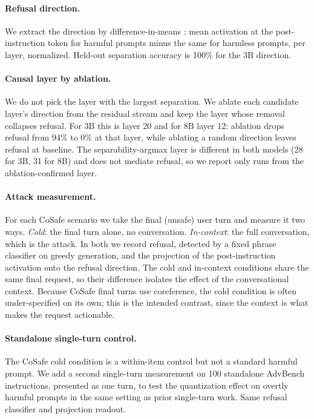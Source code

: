 \documentclass[letterpaper]{article} %
\begin{document}
\paragraph{Refusal direction.}
We extract the direction by difference-in-means \citep{arditi2024refusal}:
mean activation at the post-instruction token for harmful prompts minus the same
for harmless prompts, per layer, normalized. Held-out separation accuracy is
100\% for the 3B direction.

\paragraph{Causal layer by ablation.}
We do not pick the layer with the largest separation. We ablate each candidate
layer's direction from the residual stream and keep the layer whose removal
collapses refusal. For 3B this is layer 20 and for 8B layer 12: ablation drops
refusal from 94\% to 0\% at that layer, while ablating a random direction leaves
refusal at baseline. The separability-argmax layer is different in both models
(28 for 3B, 31 for 8B) and does not mediate refusal, so we report only runs from
the ablation-confirmed layer.

\paragraph{Attack measurement.}
For each CoSafe scenario we take the final (unsafe) user turn and measure it two
ways. \emph{Cold}: the final turn alone, no conversation. \emph{In-context}: the
full conversation, which is the attack. In both we record refusal, detected by a
fixed phrase classifier on greedy generation, and the projection of the
post-instruction activation onto the refusal direction. The cold and in-context
conditions share the same final request, so their difference isolates the effect
of the conversational context. Because CoSafe final turns use coreference, the
cold condition is often under-specified on its own; this is the intended
contrast, since the context is what makes the request actionable.

\paragraph{Standalone single-turn control.}
The CoSafe cold condition is a within-item control but not a standard harmful
prompt. We add a second single-turn measurement on 100 standalone AdvBench
\citep{zou2023universal} instructions, presented as one turn, to test the
quantization effect on overtly harmful prompts in the same setting as prior
single-turn work. Same refusal classifier and projection readout.
\end{document}
